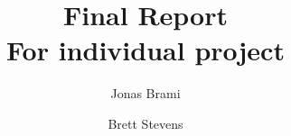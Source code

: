 \begin{frontmatter}
%
\title{%
Final Report\\
\small For individual project  %
}
%
\author{Jonas Brami} 
\author{Brett Stevens}

%
%
\renewcommand*{\today}{\DayMonthYearDateFormat\displaydate{dateName}} 
%
%
\end{frontmatter}
%
%

\ 
\vspace{1cm}

\begin{minipage}{\textwidth}
    \tableofcontents
\end{minipage}
\clearpage